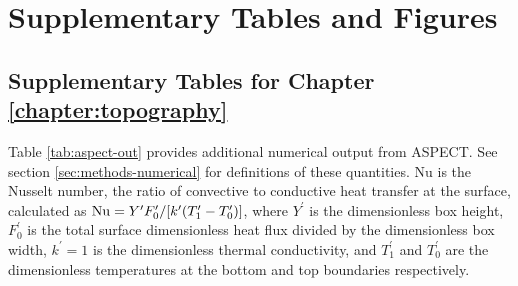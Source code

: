 
\chapter{Supplementary Tables and Figures}

\ifpdf
    \graphicspath{{Appendix2/Figs/Raster/}{Appendix2/Figs/PDF/}{Appendix2/Figs/}}
\else
    \graphicspath{{Appendix2/Figs/Vector/}{Appendix2/Figs/}}
\fi



\tochide\section{Supplementary Tables for Chapter \ref{chapter:topography}}
\label{sec:aspect-table}

Table \ref{tab:aspect-out} provides additional numerical output from ASPECT. See section \ref{sec:methods-numerical} for definitions of these quantities. Nu is the Nusselt number, the ratio of convective to conductive heat transfer at the surface, calculated as ${\rm Nu} = Y^\prime F^\prime_0 / [k^\prime(T^\prime_1 - T^\prime_0)]$, where $Y^\prime$ is the dimensionless box height, $ F^\prime_0$ is the total surface dimensionless heat flux divided by the dimensionless box width, $k^\prime = 1$ is the dimensionless thermal conductivity, and $T^\prime_1$ and $T^\prime_0$ are the dimensionless temperatures at the bottom and top boundaries respectively.

